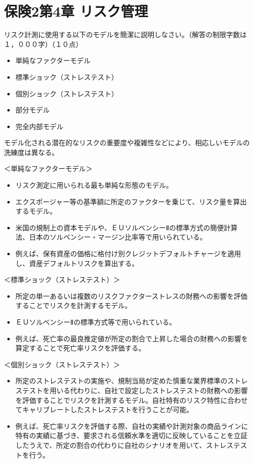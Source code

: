 \documentclass[report,gutter=10mm,fore-edge=10mm,uplatex,dvipdfmx]{jlreq}
\begin{document}
\chapter{保険2第4章 リスク管理}
リスク計測に使用する以下のモデルを簡潔に説明しなさい。（解答の制限字数は１，０００字）（１０点）
\begin{itemize}
\item[] 単純なファクターモデル
\item[] 標準ショック（ストレステスト）
\item[] 個別ショック（ストレステスト）
\item[] 部分モデル
\item[] 完全内部モデル
\end{itemize}
\answer{}
モデル化される潜在的なリスクの重要度や複雑性などにより、相応しいモデルの洗練度は異なる。

＜単純なファクターモデル＞

\begin{itemize}
\item[] リスク測定に用いられる最も単純な形態のモデル。
\item[] エクスポージャー等の基準額に所定のファクターを乗じて、リスク量を算出するモデル。
\item[] 米国の規制上の資本モデルや、ＥＵソルベンシーⅡの標準方式の簡便計算法、日本のソルベンシー・マージン比率等で用いられている。
\item[] 例えば、保有資産の価格に格付け別クレジットデフォルトチャージを適用し、資産デフォルトリスクを算出する。
\end{itemize}

＜標準ショック（ストレステスト）＞

\begin{itemize}
\item[] 所定の単一あるいは複数のリスクファクターストレスの財務への影響を評価することでリスクを計測するモデル。
\item[] ＥＵソルベンシーⅡの標準方式等で用いられている。
\item[] 例えば、死亡率の最良推定値が所定の割合で上昇した場合の財務への影響を算定することで死亡率リスクを評価する。
\end{itemize}

＜個別ショック（ストレステスト）＞

\begin{itemize}
\item[] 所定のストレステストの実施や、規制当局が定めた慎重な業界標準のストレステストを用いる代わりに、自社で設定したストレステストの財務への影響を評価することでリスクを計測するモデル。自社特有のリスク特性に合わせてキャリブレートしたストレステストを行うことが可能。
\item[] 例えば、死亡率リスクを評価する際、自社の実績や計測対象の商品ラインに特有の実績に基づき、要求される信頼水準を適切に反映していることを立証したうえで、所定の割合の代わりに自社のシナリオを用いて、ストレステストを行う。
\end{itemize}
\end{document}
